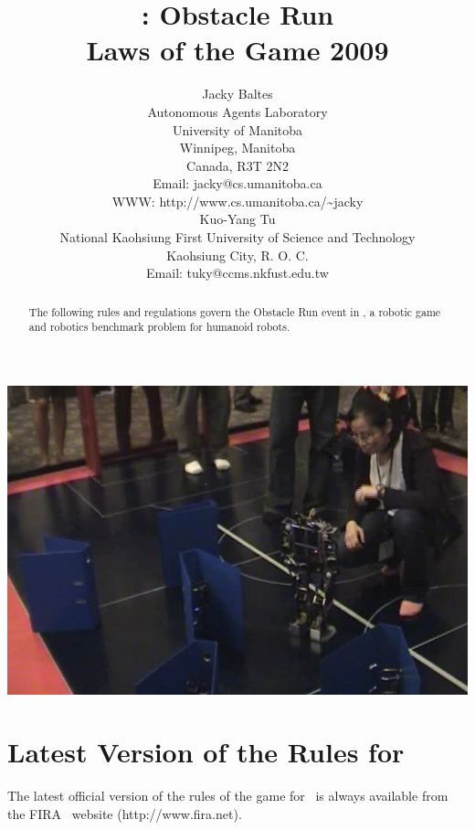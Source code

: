 \documentclass[12pt]{hurocup}
\begin{document}
\title{\HuroCup: Obstacle Run\\
  Laws of the Game 2009}


\author{Jacky Baltes\\
Autonomous Agents Laboratory\\
University of Manitoba\\
Winnipeg, Manitoba\\
Canada, R3T 2N2\\
Email: jacky@cs.umanitoba.ca\\
WWW: http://www.cs.umanitoba.ca/\~{ }jacky\\[5mm]
Kuo-Yang Tu\\
National Kaohsiung First University of Science and Technology\\
Kaohsiung City, R. O. C.\\
Email: tuky@ccms.nkfust.edu.tw\\
}

\maketitle

\begin{center}
 \includegraphics[width=0.7\linewidth]{Figures/obstacle-run-life}
\end{center}

\begin{abstract}
The following rules and regulations govern the Obstacle Run event in
\HuroCup, a robotic game and robotics benchmark problem for humanoid
robots.
%
\end{abstract}

\section*{Latest Version of the Rules for \HuroCup}
\label{sec:updates}

The latest official version of the rules of the game for \HuroCup\ is
always available from the FIRA \HuroCup\ website (http://www.fira.net).
\end{document}
